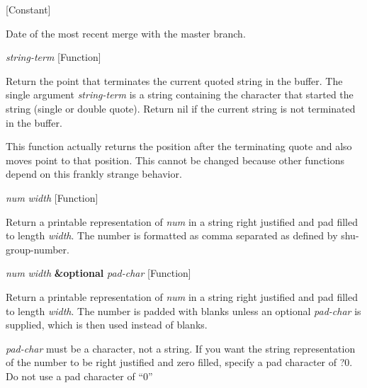 \vspace{1em}
\noindent
{}
\usebox{\funcname}
 \hfill [Constant]

\begin{doc-string}
Date of the most recent merge with the master branch.
\end{doc-string}

\vspace{1em}
\noindent
{}
\usebox{\funcname}\emph{string-term}
 \hfill [Function]

\begin{doc-string}
Return the point that terminates the current quoted string in the buffer.
The single argument \emph{string-term} is a string containing the character that
started the string (single or double quote).  Return nil if the current
string is not terminated in the buffer.

This function actually returns the position after the terminating quote and
also moves point to that position.  This cannot be changed because other
functions depend on this frankly strange behavior.
\end{doc-string}

\vspace{1em}
\noindent
{}
\usebox{\funcname}\emph{num} \emph{width}
 \hfill [Function]

\begin{doc-string}
Return a printable representation of \emph{num} in a string right justified
and pad filled to length \emph{width}.  The number is formatted as comma separated
as defined by shu-group-number.
\end{doc-string}

\vspace{1em}
\noindent
{}
\usebox{\funcname}\emph{num} \emph{width} \textbf{\&optional} \emph{pad-char}
 \hfill [Function]

\begin{doc-string}
Return a printable representation of \emph{num} in a string right justified and pad
filled to length \emph{width}.  The number is padded with blanks unless an optional
\emph{pad-char} is supplied, which is then used instead of blanks.

\emph{pad-char} must be a character, not a string.  If you want the string
representation of the number to be right justified and zero filled, specify a
pad character of ?0.  Do not use a pad character of ``0''
\end{doc-string}

